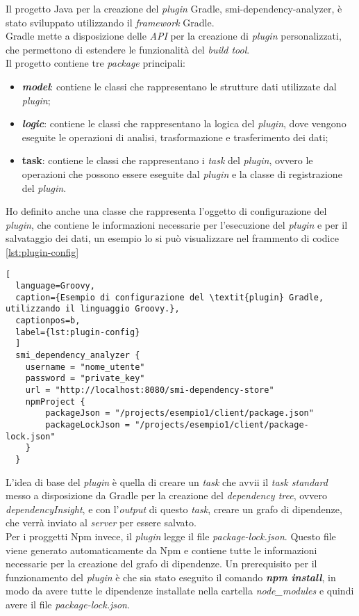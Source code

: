 Il progetto Java per la creazione del \textit{plugin} Gradle, smi-dependency-analyzer, è stato sviluppato utilizzando il \textit{framework} Gradle.\\
Gradle mette a disposizione delle \textit{API} per la creazione di \textit{plugin} personalizzati,
che permettono di estendere le funzionalità del \textit{build tool}.\\
Il progetto contiene tre \textit{package} principali:
\begin{itemize}
  \item \textbf{\textit{model}}: contiene le classi che rappresentano le strutture dati utilizzate dal \textit{plugin};
  \item \textbf{\textit{logic}}: contiene le classi che rappresentano la logica del \textit{plugin}, dove vengono eseguite le operazioni di analisi, 
  trasformazione e trasferimento dei dati;
  \item \textbf{task}: contiene le classi che rappresentano i \textit{task} del \textit{plugin}, ovvero le operazioni che possono essere eseguite dal \textit{plugin} 
  e la classe di registrazione del \textit{plugin}.
\end{itemize}

Ho definito anche una classe che rappresenta l'oggetto di configurazione del \textit{plugin}, 
che contiene le informazioni necessarie per l'esecuzione del \textit{plugin} e per il salvataggio dei dati, un esempio lo si può visualizzare nel frammento di codice \ref*{lst:plugin-config}

\begin{lstlisting}[
  language=Groovy, 
  caption={Esempio di configurazione del \textit{plugin} Gradle, utilizzando il linguaggio Groovy.},
  captionpos=b, 
  label={lst:plugin-config}
  ]
  smi_dependency_analyzer {
    username = "nome_utente"
    password = "private_key"
    url = "http://localhost:8080/smi-dependency-store"
    npmProject {
        packageJson = "/projects/esempio1/client/package.json"
        packageLockJson = "/projects/esempio1/client/package-lock.json"
    }
  }
\end{lstlisting}

L'idea di base del \textit{plugin} è quella di creare un \textit{task} che avvii il \textit{task standard} messo a disposizione da Gradle
per la creazione del \textit{dependency tree}, ovvero \textit{dependencyInsight}, e con l'\textit{output} di questo \textit{task},
creare un grafo di dipendenze, che verrà inviato al \textit{server} per essere salvato.\\
Per i proggetti Npm invece, il \textit{plugin} legge il file \textit{package-lock.json}. Questo file viene generato automaticamente
da Npm e contiene tutte le informazioni necessarie per la creazione del grafo di dipendenze.
Un prerequisito per il funzionamento del \textit{plugin} è che sia stato eseguito il comando \textbf{\textit{npm install}},
in modo da avere tutte le dipendenze installate nella cartella \textit{node\_modules} e quindi avere il file \textit{package-lock.json}.

